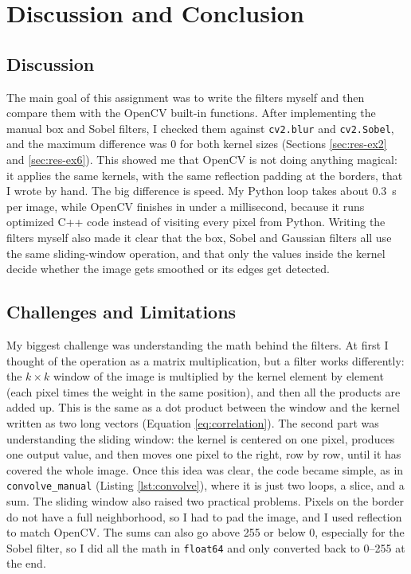 \chapter{Discussion and Conclusion}
\label{ch:conclusion}


\section{Discussion}
\label{sec:discussion}

The main goal of this assignment was to write the filters myself and then compare them with the OpenCV built-in functions. After implementing the manual box and Sobel filters, I checked them against \texttt{cv2.blur} and \texttt{cv2.Sobel}, and the maximum difference was 0 for both kernel sizes (Sections \ref{sec:res-ex2} and \ref{sec:res-ex6}). This showed me that OpenCV is not doing anything magical: it applies the same kernels, with the same reflection padding at the borders, that I wrote by hand. The big difference is speed. My Python loop takes about 0.3~s per image, while OpenCV finishes in under a millisecond, because it runs optimized C++ code instead of visiting every pixel from Python. Writing the filters myself also made it clear that the box, Sobel and Gaussian filters all use the same sliding-window operation, and that only the values inside the kernel decide whether the image gets smoothed or its edges get detected.


\section{Challenges and Limitations}
\label{sec:limitations}

My biggest challenge was understanding the math behind the filters. At first I thought of the operation as a matrix multiplication, but a filter works differently: the $k \times k$ window of the image is multiplied by the kernel element by element (each pixel times the weight in the same position), and then all the products are added up. This is the same as a dot product between the window and the kernel written as two long vectors (Equation \ref{eq:correlation}). The second part was understanding the sliding window: the kernel is centered on one pixel, produces one output value, and then moves one pixel to the right, row by row, until it has covered the whole image. Once this idea was clear, the code became simple, as in \texttt{convolve\_manual} (Listing \ref{lst:convolve}), where it is just two loops, a slice, and a sum. The sliding window also raised two practical problems. Pixels on the border do not have a full neighborhood, so I had to pad the image, and I used reflection to match OpenCV. The sums can also go above 255 or below 0, especially for the Sobel filter, so I did all the math in \texttt{float64} and only converted back to 0--255 at the end.


